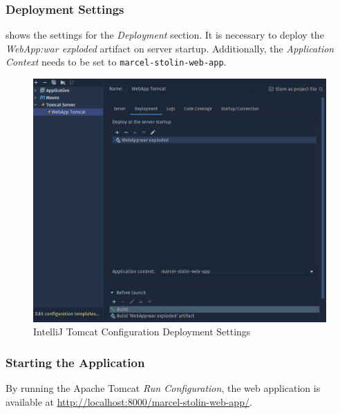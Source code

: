 \subsubsection{Deployment Settings}
 shows the settings for the \textit{Deployment} section. It is necessary to deploy the \textit{WebApp:war exploded} artifact on server startup. Additionally, the \textit{Application Context} needs to be set to \texttt{marcel-stolin-web-app}.
\begin{figure}[h]
\centering
\includegraphics[scale=0.2]{images/03_depl/tomcat-config-2}
\caption{IntelliJ Tomcat Configuration Deployment Settings}
\label{fig:03_depl_webapp_intellij_config2}
\end{figure}

\subsubsection{Starting the Application}
By running the Apache Tomcat \textit{Run Configuration}, the web application is available at \url{http://localhost:8000/marcel-stolin-web-app/}.
